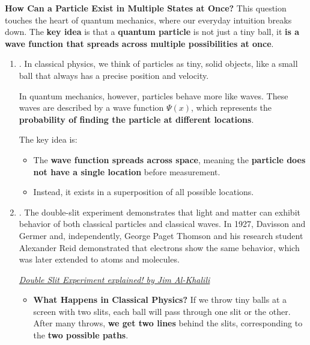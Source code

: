 \noindent
\textcolor{Green3}{ \textbf{How Can a Particle Exist in Multiple States at Once?}} This question touches the heart of quantum mechanics, where our everyday intuition breaks down. The \textbf{key idea} is that a \textbf{quantum particle} is not just a tiny ball, it \textbf{is a wave function that spreads across multiple possibilities at once}.
\begin{enumerate}
  \item {}. In classical physics, we think of particles as tiny, solid objects, like a small ball that always has a precise position and velocity.
  
  In quantum mechanics, however, particles behave more like waves. These waves are described by a wave function $\Psi(x)$, which represents the \textbf{probability of finding the particle at different locations}.
  
  The key idea is:
  \begin{itemize}
    \item The \textbf{wave function spreads across space}, meaning the \textbf{particle does not have a single location} before measurement.
    \item Instead, it exists in a superposition of all possible locations.
  \end{itemize}


  \item {}. The double-slit experiment demonstrates that light and matter can exhibit behavior of both classical particles and classical waves. In 1927, Davisson and Germer and, independently, George Paget Thomson and his research student Alexander Reid demonstrated that electrons show the same behavior, which was later extended to atoms and molecules.
  \begin{center}
    \href{https://youtu.be/A9tKncAdlHQ}{\emph{Double Slit Experiment explained! by Jim Al-Khalili}}\hspace{2em}
  \end{center}

  \begin{itemize}[label=\textcolor{Green3}{}]
    \item \textcolor{Green3}{\textbf{What Happens in Classical Physics?}} If we throw tiny balls at a screen with two slits, each ball will pass through one slit or the other. After many throws, \textbf{we get two lines} behind the slits, corresponding to the \textbf{two possible paths}.


\end{itemize}
\end{enumerate}

